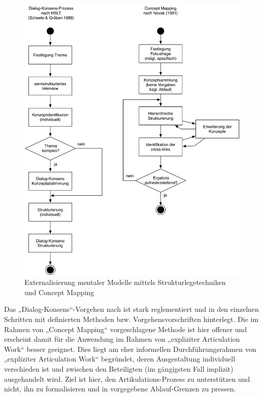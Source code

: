 \begin{figure}[htbp]
	\centering
		\includegraphics[width=\textwidth]{img/MentaleModelle/slt_cm.png}
	\caption{Externalisierung mentaler Modelle mittels Strukturlegetechniken und Concept Mapping}
	\label{fig:img_MentaleModelle_slt_cm}
\end{figure}

Das „Dialog-Konsens“-Vorgehen nach \citet{Scheele88} ist stark reglementiert und in den einzelnen Schritten mit definierten Methoden bzw. Vorgehensvorschriften hinterlegt. Die im Rahmen von „Concept Mapping“ vorgeschlagene Methode ist hier offener und erscheint damit für die Anwendung im Rahmen von „expliziter Articulation Work“ besser geeignet. Dies liegt am eher informellen Durchführungsrahmen von „expliziter Articulation Work“ begründet, deren Ausgestaltung individuell verschieden ist und zwischen den Beteiligten (im gängigsten Fall implizit) ausgehandelt wird. Ziel ist hier, den Artikulations-Prozess zu unterstützen und nicht, ihn zu formalisieren und in vorgegebene Ablauf-Grenzen zu pressen. 

